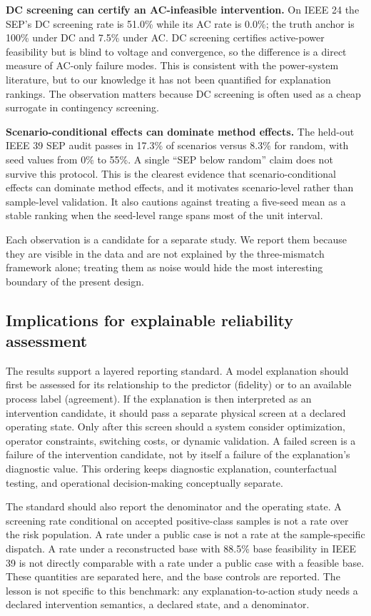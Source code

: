 \textbf{DC screening can certify an AC-infeasible intervention.} On IEEE 24 the SEP's DC screening rate is 51.0\% while its AC rate is 0.0\%; the truth anchor is 100\% under DC and 7.5\% under AC. DC screening certifies active-power feasibility but is blind to voltage and convergence, so the difference is a direct measure of AC-only failure modes. This is consistent with the power-system literature, but to our knowledge it has not been quantified for explanation rankings. The observation matters because DC screening is often used as a cheap surrogate in contingency screening.

\textbf{Scenario-conditional effects can dominate method effects.} The held-out IEEE 39 SEP audit passes in 17.3\% of scenarios versus 8.3\% for random, with seed values from 0\% to 55\%. A single ``SEP below random'' claim does not survive this protocol. This is the clearest evidence that scenario-conditional effects can dominate method effects, and it motivates scenario-level rather than sample-level validation. It also cautions against treating a five-seed mean as a stable ranking when the seed-level range spans most of the unit interval.

Each observation is a candidate for a separate study. We report them because they are visible in the data and are not explained by the three-mismatch framework alone; treating them as noise would hide the most interesting boundary of the present design.

\subsection{Implications for explainable reliability assessment}\label{implications_for_explainable_reliability_assessment}

The results support a layered reporting standard. A model explanation should first be assessed for its relationship to the predictor (fidelity) or to an available process label (agreement). If the explanation is then interpreted as an intervention candidate, it should pass a separate physical screen at a declared operating state. Only after this screen should a system consider optimization, operator constraints, switching costs, or dynamic validation. A failed screen is a failure of the intervention candidate, not by itself a failure of the explanation's diagnostic value. This ordering keeps diagnostic explanation, counterfactual testing, and operational decision-making conceptually separate.

The standard should also report the denominator and the operating state. A screening rate conditional on accepted positive-class samples is not a rate over the risk population. A rate under a public case is not a rate at the sample-specific dispatch. A rate under a reconstructed base with 88.5\% base feasibility in IEEE 39 is not directly comparable with a rate under a public case with a feasible base. These quantities are separated here, and the base controls are reported. The lesson is not specific to this benchmark: any explanation-to-action study needs a declared intervention semantics, a declared state, and a denominator.

